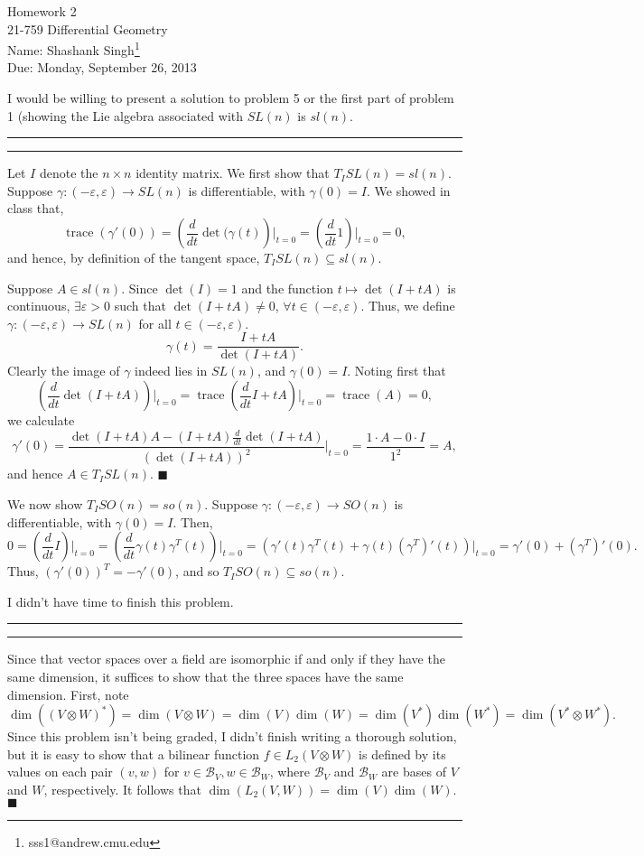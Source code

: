 \documentclass[11pt]{article}
\makeatletter
\newcounter{questionCounter}
\newcounter{partCounter}[questionCounter]
\newenvironment{question}[2][\arabic{questionCounter}]{%
    \setcounter{partCounter}{0}%
    \vspace{.25in} \hrule \vspace{0.5em}%
        \noindent{\bf #2}%
    \vspace{0.8em} \hrule \vspace{.10in}%
    \addtocounter{questionCounter}{1}%
}{}
\newcommand{\myname}{Shashank Singh}
\newcommand{\myandrew}{sss1@andrew.cmu.edu}
\newcommand{\myclass}{21-759 Differential Geometry}
\newcommand{\myhwnum}{2}
\newcommand{\duedate}{Monday, September 26, 2013}
\renewcommand{\qed}{\quad \ensuremath{\blacksquare}}    %
\renewcommand{\dim}{\operatorname{dim}} %
\renewcommand{\det}{\operatorname{det}} %
\newcommand{\tr}{\operatorname{trace}}  %
\newcommand{\B}{\mathcal{B}}            %
\newcommand{\e}{\varepsilon}            %
\makeatother
\begin{document}
\thispagestyle{plain}

{\Large Homework \myhwnum} \\
\myclass \\
Name: \myname\footnote{\myandrew} \\
Due: \duedate

I would be willing to present a solution to problem 5 or the first part of
problem 1 (showing the Lie algebra associated with $SL(n)$ is $sl(n)$.

\begin{question}{Problem 1}
Let $I$ denote the $n \times n$ identity matrix. We first show that
$T_ISL(n) = sl(n)$. Suppose $\gamma : (-\e,\e) \to SL(n)$ is differentiable,
with $\gamma(0) = I$. We showed in class that,
\[\tr(\gamma'(0))
    = \left( \frac{d}{dt}\det( \gamma(t) \right)\bigg|_{t = 0}
    = \left( \frac{d}{dt} 1 \right)\bigg|_{t = 0}
    = 0,\]
and hence, by definition of the tangent space, $T_ISL(n) \subseteq sl(n)$.

Suppose $A \in sl(n)$. Since $\det(I) = 1$ and the function
$t \mapsto \det(I + tA)$ is continuous, $\exists \e > 0$ such that
$\det(I + tA) \neq 0$, $\forall t \in (-\e,\e)$. Thus, we define
$\gamma : (-\e,\e) \to SL(n)$ for all $t \in (-\e,\e)$.
\[\gamma(t) = \frac{I + tA}{\det(I + tA)}.\]
Clearly the image of $\gamma$ indeed lies in $SL(n)$, and $\gamma(0) = I$.
Noting first that
\[\left( \frac{d}{dt} \det(I + tA) \right)\bigg|_{t = 0}
    = \tr\left( \frac{d}{dt} I + tA \right) \bigg|_{t = 0}
    = \tr(A)
    = 0,\]
we calculate
\[\gamma'(0)
    = \frac{\det(I + tA)A - (I + tA)\frac{d}{dt}\det(I + tA)}
           {(\det(I + tA))^2}\bigg|_{t = 0}
    = \frac{1\cdot A - 0\cdot I}{1^2}
    = A,
\]
and hence $A \in T_ISL(n)$. \qed

We now show $T_ISO(n) = so(n)$. Suppose $\gamma : (-\e,\e) \to SO(n)$ is
differentiable, with $\gamma(0) = I$. Then,
\[0
    = \left( \frac{d}{dt} I \right)\bigg|_{t = 0}
    = \left( \frac{d}{dt} \gamma(t)\gamma^T(t) \right)\bigg|_{t = 0}
    = \left( \gamma'(t)\gamma^T(t) + \gamma(t)(\gamma^T)'(t) \right)\bigg|_{t = 0}
    = \gamma'(0) + (\gamma^T)'(0).
\]
Thus, $(\gamma'(0))^T = -\gamma'(0)$, and so $T_ISO(n) \subseteq so(n)$.

I didn't have time to finish this problem.
\end{question}

\newpage
\begin{question}{Problem 2}
Since that vector spaces over a field are isomorphic if and only if they have
the same dimension, it suffices to show that the three spaces have the same
dimension. First, note
\[\dim((V \otimes W)^*)
    = \dim(V \otimes W)
    = \dim(V)\dim(W)
    = \dim(V^*)\dim(W^*)
    = \dim(V^* \otimes W^*).
\]
Since this problem isn't being graded, I didn't finish writing a thorough
solution, but it is easy to show that a bilinear function
$f \in L_2(V \otimes W)$ is defined by its values on each pair $(v,w)$ for $v
\in \B_V, w \in \B_W$, where $\B_V$ and $\B_W$ are bases of $V$ and $W$,
respectively. It follows that $\dim(L_2(V,W)) = \dim(V)\dim(W)$. \qed
\end{question}
\end{document}
